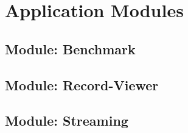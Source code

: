 \chapter{Application Modules}
\label{ch:app}

\section{Module: Benchmark}
\label{sec:benchmark}

\section{Module: Record-Viewer}
\label{sec:recordviewer}

\section{Module: Streaming}
\label{sec:streaming}

